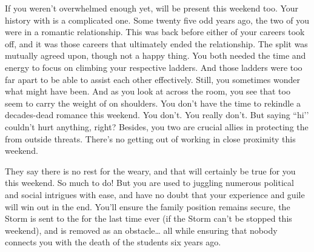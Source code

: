 \documentclass[char]{GL2020}
\begin{document}
If you weren’t overwhelmed enough yet, \cAntiChup{\full} will be present this weekend too. Your history with \cAntiChup{} is a complicated one. Some twenty five odd years ago, the two of you were in a romantic relationship. This was back before either of your careers took off, and it was those careers that ultimately ended the relationship. The split was mutually agreed upon, though not a happy thing. You both needed the time and energy to focus on climbing your respective ladders. And those ladders were too far apart to be able to assist each other effectively. Still, you sometimes wonder what might have been. And as you look at \cAntiChup{\them} across the room, you see that \cAntiChup{\they} too seem\cAntiChup{\verbs} to carry the weight of \pEarth{} on \cAntiChup{\their} shoulders. You don’t have the time to rekindle a decades-dead romance this weekend. You don’t. You really don’t. But saying ``hi’’ couldn’t hurt anything, right? Besides, you two are crucial allies in protecting the \pTech{} from outside threats. There’s no getting out of working in close proximity this weekend.

They say there is no rest for the weary, and that will certainly be true for you this weekend. So much to do! But you are used to juggling numerous political and social intrigues with ease, and have no doubt that your experience and guile will win out in the end. You'll ensure the \cHeir{\formal} family position remains secure, the Storm is sent to the \pShip{} for the last time ever (if the Storm can’t be stopped this weekend), and \cLoud{} is removed as an obstacle\ldots{} all while ensuring that nobody connects you with the death of the students six years ago.
\end{document}
